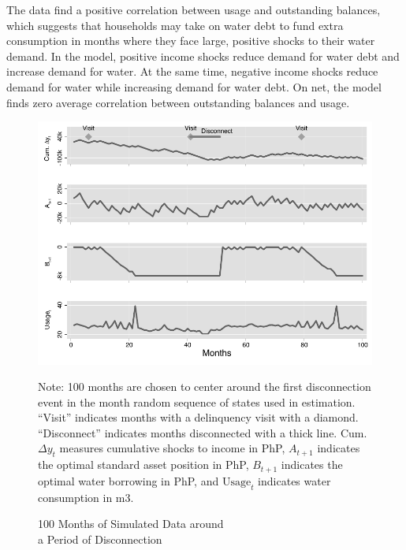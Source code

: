 \documentclass[12pt]{article}
\begin{document}
The data find a positive correlation between usage and outstanding balances, which suggests that households may take on water debt to fund extra consumption in months where they face large, positive shocks to their water demand.  In the model, positive income shocks reduce demand for water debt and increase demand for water. At the same time, negative income shocks reduce demand for water while increasing demand for water debt.  On net, the model finds zero average correlation between outstanding balances and usage. %

\begin{figure}[H]
\centering
\caption{100 Months of Simulated Data around \\ a Period of Disconnection}\label{figure:deaton}
\includegraphics[scale=1.1]{tables/new_deaton_graph.pdf} \\
{\scriptsize  
Note: 100 months are chosen to center around the first disconnection event in the month random sequence of states used in estimation.  ``Visit'' indicates months with a delinquency visit with a diamond.  ``Disconnect'' indicates months disconnected with a thick line.  Cum. $\Delta y_t$ measures cumulative shocks to income in PhP, $A_{t+1}$ indicates the optimal standard asset position in PhP, $B_{t+1}$ indicates the optimal water borrowing in PhP, and $\text{Usage}_t$ indicates water consumption in m3.
\par}
\end{figure}
\end{document}
